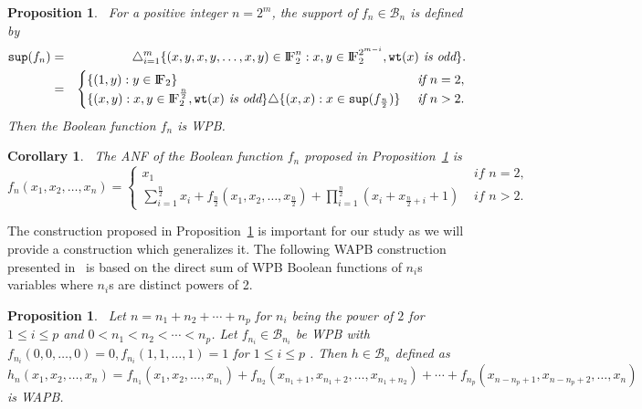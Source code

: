 \documentclass{article}[12pt]
\newtheorem{corollary}[theorem]{Corollary}
\newtheorem{proposition}[theorem]{Proposition}
\newcommand{\FF}{{\rm I\!F}}
\newcommand{\CB}{\mathcal{B}}
\newcommand{\wt}{\mathtt{wt}}
\newcommand{\spt}{\mathtt{sup}}
\begin{document}
\begin{proposition}~\cite{MS21}\label{cons:MS}
For a positive integer $n = 2^m$, the support of $f_n\in\CB_n$ is defined by
\begin{eqnarray*}
\spt(f_n) & = & \triangle_{i=1}^m \{(x,y,x,y,\ldots ,x,y) \in \FF_2^{n} : x,y \in \FF_2^{2^{m-i}}, \wt(x) \textit{ is odd} \}. \\
         & = & \begin{cases}
         \{(1,y) : y \in \FF_2\} & \textit{ if } n = 2, \\
         \{(x,y) : x,y \in \FF_2^{\frac{n}{2}}, \wt(x) \textit{ is odd}\}
         \triangle \{(x,x) : x \in \spt(f_{\frac{n}{2}})\} & \textit{ if } n > 2.
         \end{cases}
\end{eqnarray*}
Then the Boolean function $f_n$ is WPB.
\end{proposition}
\begin{corollary}~\cite{MS21}\label{cor:MS}
The ANF of the Boolean function $f_n$ proposed in Proposition~\ref{cons:MS} is 
$$f_n(x_1, x_2, \ldots, x_n) = \begin{cases}
x_1 & \textit{ if } n = 2, \\
\displaystyle{\sum_{i=1}^{\frac{n}{2}} x_i + f_{\frac{n}{2}}(x_1, x_2, \ldots, x_{\frac{n}{2}}) + \prod_{i=1}^{\frac{n}{2}}(x_i + x_{\frac{n}{2}+i}+1)} & \textit{ if } n > 2.
\end{cases}$$
\end{corollary}
The construction proposed in Proposition~\ref{cons:MS} is important for our study as we will provide a construction which generalizes it. The following WAPB construction presented in~\cite{ZS22} is based on the direct sum of WPB Boolean functions of $n_{i}$s variables where $n_{i}$s are distinct powers of 2. 

\begin{proposition}~\cite{ZS22}\label{cons:ZS}
Let $n = n_1 + n_2 + \cdots + n_p$ for $n_i$ being the power of $2$ for $1 \leq i \leq p$ and $0< n_1 < n_2 < \cdots < n_{p}$. Let $f_{n_{i}} \in\CB_{n_{i}}$ be WPB with $f_{n_{i}}(0, 0, \ldots, 0) = 0 , f_{n_{i}}(1,1, \ldots,1) = 1$ for $1 \leq i \leq p$ .  Then $h \in \CB_n$ defined as 
 \begin{equation*}
 h_n(x_1,x_2, \ldots, x_n) = f_{n_1}(x_1,x_2,\ldots, x_{n_1}) + f_{n_2}(x_{n_1+1},x_{n_1+2}, \ldots, x_{n_1+n_2} ) +
 \cdots + f_{n_{p}}(x_{n-n_{p}+1}, x_{n-n_{p}+2}, \ldots, x_n)
 \end{equation*}
 is WAPB.
 \end{proposition}
\end{document}
